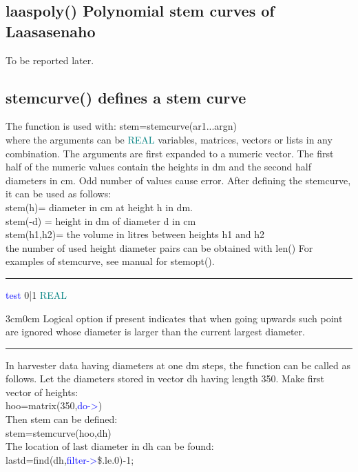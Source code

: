 \subsection{\textcolor{VioletRed}{laaspoly}() Polynomial stem curves of Laasasenaho} 
\label{laaspoly} 
To be reported later. 
\subsection{\textcolor{VioletRed}{stemcurve}() defines a stem curve} 
\label{stemcurve} 
The function is used with: 
stem=\textcolor{VioletRed}{stemcurve}(ar1...argn)\\ 
where the arguments can be \textcolor{teal}{REAL} variables, matrices, vectors or lists in any combination. 
The arguments are first expanded to a numeric vector. The first half of the numeric values 
contain the heights in dm and the second half diameters in cm. Odd number of values 
cause error. After defining the stemcurve, it can be used as follows:\\ 
stem(h)= diameter in cm at height h in dm.\\ 
stem(-d) = height in dm of diameter d in cm\\ 
stem(h1,h2)= the volume in litres between heights h1 and h2\\ 
the number of used height diameter pairs can be obtained with \textcolor{VioletRed}{len}() 
For examples of stemcurve, see manual for \textcolor{VioletRed}{stemopt}(). 
\vspace{0.3cm} 
\hrule 
\vspace{0.3cm} 
\noindent \textcolor{blue}{test} \tabto{3cm} 0|1 \tabto{5cm}  \textcolor{teal}{REAL} \tabto{7cm} 
\begin{changemargin}{3cm}{0cm} 
\noindent  Logical option if present indicates that when going upwards such point 
are ignored whose diameter is larger than the current largest diameter. 
\end {changemargin} 
\hrule 
\vspace{0.2cm} 
\begin{note} 
In harvester data having diameters at one dm steps, the function can be called as follows. 
Let the diameters stored in vector dh having length 350. Make first vector of heights:\\ 
hoo=\textcolor{VioletRed}{matrix}(350,\textcolor{blue}{do->})\\ 
Then stem can be defined:\\ 
stem=\textcolor{VioletRed}{stemcurve}(hoo,dh)\\ 
The location of last diameter in dh can be found:\\ 
lastd=\textcolor{VioletRed}{find}(dh,\textcolor{blue}{filter->}\$.le.0)-1; 
\end{note} 
